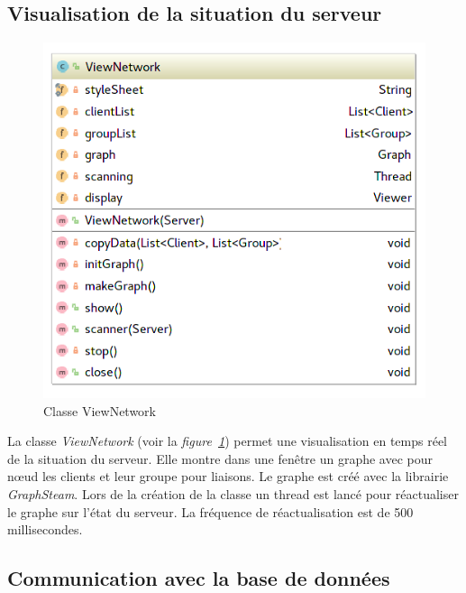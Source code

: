 \documentclass[a4paper, titlepage]{livret}
\begin{document}
\subsection{Visualisation de la situation du serveur}

    \begin{figure}[th]
      \begin{center}
        \includegraphics[scale=0.3]{Assets/UML_Network.png}
        \caption{Classe ViewNetwork}
        \label{Classe ViewNetwork}
      \end{center}
    \end{figure}
    
    La classe \textit{ViewNetwork} (voir la \textit{figure~\ref{Classe ViewNetwork}}) permet une visualisation en temps réel de la situation du serveur. Elle montre dans une fenêtre un graphe avec pour nœud les clients et leur groupe pour liaisons. Le graphe est créé avec la librairie \textit{GraphSteam}. Lors de la création de la classe un thread est lancé pour réactualiser le graphe sur l’état du serveur. La fréquence de réactualisation est de 500 millisecondes.

\subsection{Communication avec la base de données}
\end{document}
